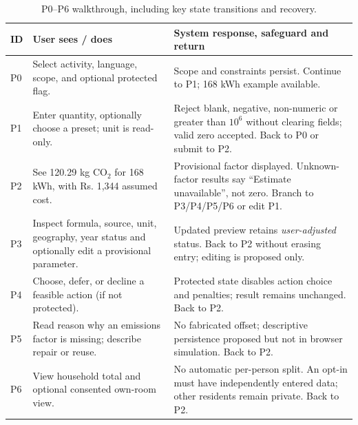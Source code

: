 \documentclass[12pt,a4paper]{article}
\begin{document}
\begin{table}[H]
\centering\footnotesize
\caption{P0--P6 walkthrough, including key state transitions and recovery.}
\label{tab:walkthrough}
\begin{tabularx}{\textwidth}{@{}p{0.8cm}p{4.1cm}X@{}}
\toprule
\textbf{ID}&\textbf{User sees / does}&\textbf{System response, safeguard and return}\\
\midrule
P0&Select activity, language, scope, and optional protected flag.&Scope and constraints persist. Continue to P1; 168 kWh example available.\\
P1&Enter quantity, optionally choose a preset; unit is read-only.&Reject blank, negative, non-numeric or greater than $10^6$ without clearing fields; valid zero accepted. Back to P0 or submit to P2.\\
P2&See 120.29 kg CO$_2$ for 168 kWh, with Rs. 1,344 assumed cost.&Provisional factor displayed. Unknown-factor results say ``Estimate unavailable'', not zero. Branch to P3/P4/P5/P6 or edit P1.\\
P3&Inspect formula, source, unit, geography, year status and optionally edit a provisional parameter.&Updated preview retains \emph{user-adjusted} status. Back to P2 without erasing entry; editing is proposed only.\\
P4&Choose, defer, or decline a feasible action (if not protected).&Protected state disables action choice and penalties; result remains unchanged. Back to P2.\\
P5&Read reason why an emissions factor is missing; describe repair or reuse.&No fabricated offset; descriptive persistence proposed but not in browser simulation. Back to P2.\\
P6&View household total and optional consented own-room view.&No automatic per-person split. An opt-in must have independently entered data; other residents remain private. Back to P2.\\
\bottomrule
\end{tabularx}
\end{table}
\end{document}
